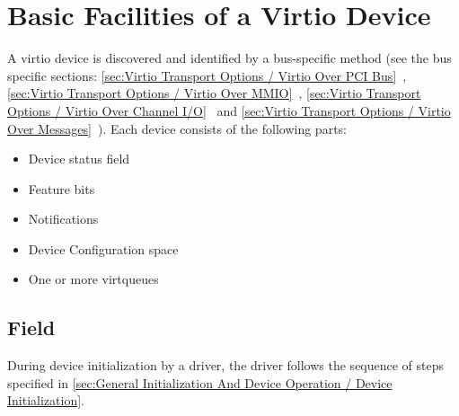 \chapter{Basic Facilities of a Virtio Device}\label{sec:Basic Facilities of a Virtio Device}

A virtio device is discovered and identified by a bus-specific method
(see the bus specific sections: \ref{sec:Virtio Transport Options / Virtio Over PCI Bus}~,
\ref{sec:Virtio Transport Options / Virtio Over MMIO}~,
\ref{sec:Virtio Transport Options / Virtio Over Channel I/O}~
and \ref{sec:Virtio Transport Options / Virtio Over Messages}~). Each
device consists of the following parts:

\begin{itemize}
\item Device status field
\item Feature bits
\item Notifications
\item Device Configuration space
\item One or more virtqueues
\end{itemize}

\section{ Field}\label{sec:Basic Facilities of a Virtio Device / Device Status Field}
During device initialization by a driver,
the driver follows the sequence of steps specified in
\ref{sec:General Initialization And Device Operation / Device
Initialization}.

